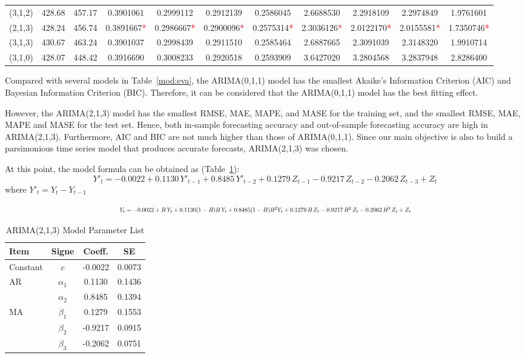 \documentclass[12pt,a4paper]{report} %
\begin{document}
\begin{table}[htbp]
{\begin{tabular}{l c c c c c c c c c c }
				(3,1,2) & 428.68 & 457.17 & 0.3901061 & 0.2999112 & 0.2912139 & 0.2586045 & 2.6688530 & 2.2918109 & 2.2974849 & 1.9761601  \\
				(2,1,3) & 428.24 & 456.74 & 0.3891667\textcolor{red}{*} & 0.2986667\textcolor{red}{*} & 0.2900096\textcolor{red}{*} & 0.2575314\textcolor{red}{*} & 2.3036126\textcolor{red}{*} & 2.0122170\textcolor{red}{*} & 2.0155581\textcolor{red}{*} & 1.7350746\textcolor{red}{*}  \\
				(3,1,3) & 430.67 & 463.24 & 0.3901037 & 0.2998439 & 0.2911510 & 0.2585464 & 2.6887665 & 2.3091039 & 2.3148320 & 1.9910714  \\
				(3,1,0) & 428.07 & 448.42 & 0.3916690 & 0.3008233 & 0.2920518 & 0.2593909 & 3.6427020 & 3.2804568 & 3.2837948 & 2.8286400  \\
				\hline
			\end{tabular}%
		}
	\end{table}
	
	
	Compared with several models in Table~\ref{mod:eva}, the ARIMA(0,1,1) model has the smallest Akaike’s Information Criterion (AIC) and Bayesian Information Criterion (BIC). Therefore, it can be considered that the ARIMA(0,1,1) model has the best fitting effect. 
	
	However, the ARIMA(2,1,3) model has the smallest RMSE, MAE, MAPE, and MASE for the training set, and the smallest RMSE, MAE, MAPE and MASE for the test set. Hence, both in-sample forecasting accuracy and out-of-sample forecasting accuracy are high in ARIMA(2,1,3). Furthermore, AIC and BIC are not much higher than those of ARIMA(0,1,1). Since our main objective is also to build a parsimonious time series model that produces accurate forecasts, ARIMA(2,1,3) was chosen. 
	
	At this point, the model formula can be obtained as (Table~\ref{mod:para}):
	\[
	Y'_t = -0.0022 + 0.1130\,Y'_{t-1} + 0.8485\,Y'_{t-2} + 0.1279\,Z_{t-1} - 0.9217\,Z_{t-2} - 0.2062\,Z_{t-3} + Z_t
	\]
	where $Y'_t = Y_t - Y_{t-1}$
		
	\[
	\resizebox{\textwidth}{!}{$
		Y_t = -0.0022 + B\,Y_{t} + 0.1130(1-B)B\,Y_{t} + 0.8485(1-B)B^{2}Y_{t}
		+ 0.1279\,B\,Z_{t} - 0.9217\,B^2\,Z_{t} - 0.2062\,B^3\,Z_{t} + Z_t
		$}
	\]

	
	\begin{table}[htbp]
		\centering
		\caption{ARIMA(2,1,3) Model Parameter List}
		\label{mod:para}
		\begin{tabular}{l c c c}
			\hline
			Item & Signe & Coeff. & SE \\
			\hline
			Constant & $c$ & -0.0022 & 0.0073 \\
			AR & $\alpha_1$ & 0.1130 & 0.1436 \\
			& $\alpha_2$ & 0.8485 & 0.1394 \\
			MA & $\beta_1$ & 0.1279 & 0.1553 \\
			& $\beta_2$ & -0.9217 & 0.0915 \\
			& $\beta_3$ & -0.2062 & 0.0751 \\
			\hline
		\end{tabular}
	\end{table}
	
\end{document}
